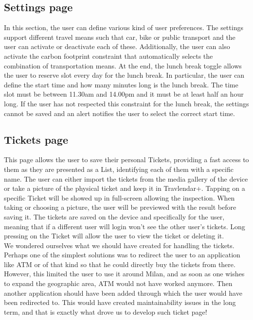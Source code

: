 \subsection*{Settings page}
In this section, the user can define various kind of user preferences. The settings support different travel means such that car, bike or public transport and the user can activate or deactivate each of these. Additionally, the user can also activate the carbon footprint constraint that automatically selects the combination of transportation means. At the end, the lunch break toggle allows the user to reserve slot every day for the lunch break. In particular, the user can define the start time and how many minutes long is the lunch break. The time slot must be between 11.30am and 14.00pm and it must be at least half an hour long. If the user has not respected this constraint for the lunch break, the settings cannot be saved and an alert notifies the user to select the correct start time.

\subsection*{Tickets page}
This page allows the user to save their personal Tickets, providing a fast access to them as they are presented as a List, identifying each of them with a specific name. The user can either import the tickets from the media gallery of the device or take a picture of the physical ticket and keep it in Travlendar+. Tapping on a specific Ticket will be showed up in full-screen allowing the inspection. When taking or choosing a picture, the user will be previewed with the result before saving it.  The tickets are saved on the device and specifically for the user, meaning that if a different user will login won't see the other user's tickets.
Long pressing on the Ticket will allow the user to view the ticket or deleting it. \\

We wondered ourselves what we should have created for handling the tickets. Perhaps one of the simplest solutions was to redirect the user to an application like ATM or of that kind so that he could directly buy the tickets from there. However, this limited the user to use it around Milan, and as soon as one wishes to expand the geographic area, ATM would not have worked anymore. Then another application should have been added through which the user would have been redirected to. This would have created maintainability issues in the long term, and that is exactly what drove us to develop such ticket page!







